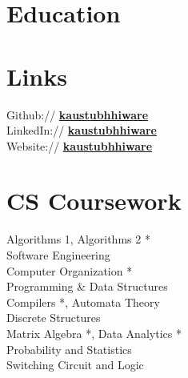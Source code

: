 \documentclass[a4paper]{deedy-resume} %
\begin{document}
\begin{minipage}[t]{0.33\textwidth} %

  \section{Education} 



  \sectionspace
  \sectionspace
  

  \sectionspace
  \sectionspace
  
    
  \sectionspace

  \section{Links} 

  Github:// \href{https://github.com/kaustubhhiware}{\bf kaustubhhiware} \\
  LinkedIn:// \href{https://www.linkedin.com/in/kaustubhhiware}{\bf kaustubhhiware} \\
  Website:// \href{http://kaustubhhiware.github.io/}{\bf kaustubhhiware} \\
  
  \sectionspace

  \section{CS Coursework}
  Algorithms 1, Algorithms 2 *\\
  Software Engineering \\
  Computer Organization *\\
  Programming \& Data Structures\\
  Compilers *, Automata Theory\\
  Discrete Structures\\
  Matrix Algebra *, Data Analytics *\\
  Probability and Statistics\\
  Switching Circuit and Logic \\


\end{minipage}
\end{document}
